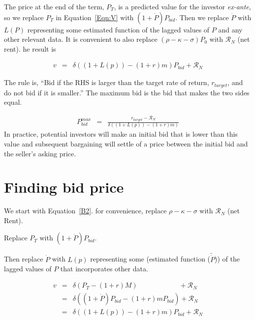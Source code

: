 The  price at the end of the term,  $P_T$, is a predicted value  for the investor \textit{ex-ante}, so we replace $P_T$ in Equation~\ref{Eqn:V} with $(1+\dot P)P_{bid}$. Then we replace $\dot P$ with $L(P)$ representing some estimated function of the lagged values of $P$ and any  other relevant data. It is  convenient to also replace $(\rho -\kappa - \sigma)P_0$ with $\mathcal{R}_N$ (net rent). he result is 

\begin{eqnarray}
v %
  &=&\delta\left( (1+L(p)) - (1+r)m \right) P_{bid} + \mathcal{R}_N  \nonumber
\end{eqnarray}

The rule is, ``Bid if the RHS is larger than the target rate of return, $r_{target}$, and do not bid if it is smaller.''  The maximum bid  is the bid that makes the two sides equal. 

\begin{eqnarray}
   P^{max}_{bid} &=&\frac{r_{target} - \mathcal{R}_N}{\delta\left((1+L(p)) - (1+r)m \right)} \label{EqBidPrice} 
\end{eqnarray}
In practice, potential investors will make an  initial  bid that is lower than this value and subsequent bargaining will settle of a price between the initial bid and the seller's asking price.


\section{Finding bid price}
We start with Equation~\ref{B2}. for convenience, replace $\rho -\kappa - \sigma $ with $\mathcal{R}_N$ (net Rent). 

Replace $P_T$ with $(1+\dot P)P_{bid}$.

Then replace   $\dot P$ with $L(p)$ representing some (estimated function ($\tilde{\dot P}$)) of the lagged values of $P$ that incorporates other data. 

\begin{eqnarray}
v&=& \delta(P_T- (1+r)M) \qquad \qquad \qquad 	 + \mathcal{R}_N \nonumber\\
 &=&\delta\left( (1+\dot P)P_{bid} - (1+r)mP_{bid} \right)  + \mathcal{R}_N  \nonumber\\
  &=&\delta\left( (1+L(p)) - (1+r)m \right) P_{bid} + \mathcal{R}_N  \nonumber
\end{eqnarray}


